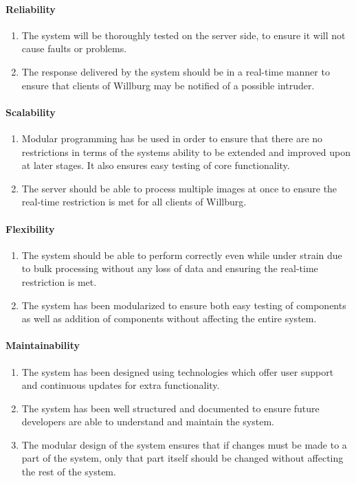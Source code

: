 \documentclass[a4paper,12pt]{report}
\begin{document}
\paragraph{Reliability}
\begin{enumerate}
	\item The system will be thoroughly tested on the server side, to ensure it will not cause faults or problems. 
	\item The response delivered by the system should be in a real-time manner to ensure that clients of Willburg may be notified of a possible intruder.
\end{enumerate}
\paragraph{Scalability}
\begin{enumerate}
	\item Modular programming has be used in order to ensure that there are no restrictions in terms of the systems ability to be extended and improved upon at later stages. It also ensures easy testing of core functionality.
	\item The server should be able to process multiple images at once to ensure the real-time restriction is met for all clients of Willburg.
\end{enumerate}
\paragraph{Flexibility}
\begin{enumerate}
	\item The system should be able to perform correctly even while under strain due to bulk processing without any loss of data and ensuring the real-time restriction is met.
	\item The system has been modularized to ensure both easy testing of components as well as addition of components without affecting the entire system.
\end{enumerate}
\paragraph{Maintainability}
\begin{enumerate}
	\item The system has been designed using technologies which offer user support and continuous updates for extra functionality.
	\item The system has been well structured and documented to ensure future developers are able to understand and maintain the system.
	\item The modular design of the system ensures that if changes must be made to a part of the system, only that part itself should be changed without affecting the rest of the system.
\end{enumerate}
\end{document}
